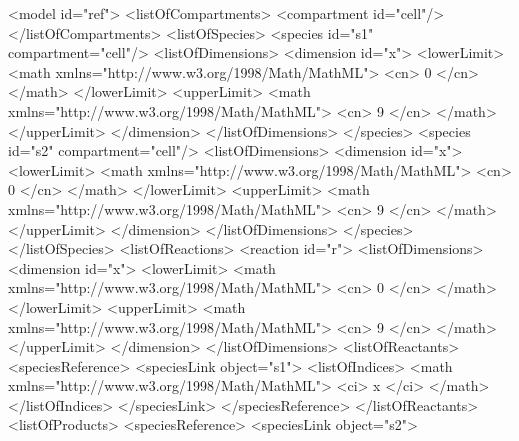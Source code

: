 \documentclass{cekarticle}
\begin{document}
\begin{example}
<model id="ref">
    <listOfCompartments>
        <compartment id="cell"/>
    </listOfCompartments>
    <listOfSpecies>
        <species id="s1" compartment="cell"/>
            <listOfDimensions>
                <dimension id="x">
                    <lowerLimit>
                        <math xmlns="http://www.w3.org/1998/Math/MathML">
                            <cn> 0 </cn>
                        </math>
                    </lowerLimit>
                    <upperLimit>
                        <math xmlns="http://www.w3.org/1998/Math/MathML">
                            <cn> 9 </cn>
                        </math>
                    </upperLimit>
                </dimension>
            </listOfDimensions>
        </species>
        <species id="s2" compartment="cell"/>
            <listOfDimensions>
                <dimension id="x">
                    <lowerLimit>
                        <math xmlns="http://www.w3.org/1998/Math/MathML">
                            <cn> 0 </cn>
                        </math>
                    </lowerLimit>
                    <upperLimit>
                        <math xmlns="http://www.w3.org/1998/Math/MathML">
                            <cn> 9 </cn>
                        </math>
                    </upperLimit>
                </dimension>
            </listOfDimensions>
        </species>
    </listOfSpecies>
    <listOfReactions>
        <reaction id="r">
            <listOfDimensions>
                <dimension id="x">
                    <lowerLimit>
                        <math xmlns="http://www.w3.org/1998/Math/MathML">
                            <cn> 0 </cn>
                        </math>
                    </lowerLimit>
                    <upperLimit>
                        <math xmlns="http://www.w3.org/1998/Math/MathML">
                            <cn> 9 </cn>
                        </math>
                    </upperLimit>
                </dimension>
            </listOfDimensions>
            <listOfReactants>
                <speciesReference>
                    <speciesLink object="s1">
                        <listOfIndices>
                            <math xmlns="http://www.w3.org/1998/Math/MathML">
                                <ci> x </ci>
                            </math>
                        </listOfIndices>
                    </speciesLink>
                </speciesReference>
            </listOfReactants>
            <listOfProducts>
                <speciesReference>
                    <speciesLink object="s2">

\end{example}
\end{document}
